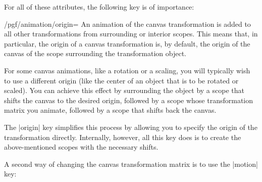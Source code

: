 For all of these attributes, the following key is of importance:
\begin{key}{/pgf/animation/origin=}
  An animation of the canvas transformation is added to all other
  transformations from surrounding or interior scopes. This means
  that, in particular, the origin of a canvas transformation is, by
  default, the origin of the canvas of the scope surrounding the
  transformation object.

  For some canvas animations, like a rotation or a scaling, you will
  typically wish to use a different origin (like the center of an
  object that is to be rotated or scaled). You can achieve this effect
  by surrounding the object by a scope that shifts the canvas to the
  desired origin, followed by a scope whose transformation matrix you
  animate, followed by a scope that shifts back the canvas.

  The |origin| key simplifies this process by allowing you to specify
  the origin of the transformation directly. Internally, however, all
  this key does is to create the above-mentioned scopes with the
  necessary shifts.
  
\begin{codeexample}[width=2.3cm]
\end{codeexample}
\end{key}


A second way of changing the canvas transformation matrix is to use
the |motion| key:

\begin{codeexample}[width=2.3cm]
\end{codeexample}



